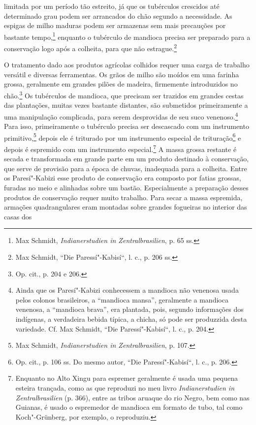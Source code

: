 limitada por um período tão estreito, já que os tubérculos crescidos até
determinado grau podem ser arrancados do chão segundo a necessidade. As
espigas de milho maduras podem ser armazenas sem mais precauções por
bastante tempo,\footnote{Max Schmidt, \emph{Indianerstudien in
  Zentralbrasilien}, p. 65 ss.} enquanto o tubérculo de mandioca
precisa ser preparado para a conservação logo após a colheita, para que
não estrague.\footnote{Max Schmidt, ``Die Paressí"-Kabisí``, l. c., p. 206
  ss.}

O tratamento dado aos produtos agrícolas colhidos requer uma carga de
trabalho versátil e diversas ferramentas. Os grãos de milho são moídos
em uma farinha grossa, geralmente em grandes pilões de madeira,
firmemente introduzidos no chão.\footnote{Op. cit., p. 204 e 206.} Os
tubérculos de mandioca, que precisam ser trazidos em grandes cestas das
plantações, muitas vezes bastante distantes, são submetidos
primeiramente a uma manipulação complicada, para serem desprovidas de
seu suco venenoso.\footnote{Ainda que os Paresí"-Kabizi conhecessem a
  mandioca não venenosa usada pelos colonos brasileiros, a ``mandioca
  mansa'', geralmente a mandioca venenosa, a ``mandioca brava'', era
  plantada, pois, segundo informações dos indígenas, a verdadeira bebida
  típica, a chicha, só pode ser produzzida desta variedade. Cf. Max
  Schmidt, ``Die Paressí"-Kabisí``, l. c., p. 204.} Para isso,
primeiramente o tubérculo precisa ser descascado com um instrumento
primitivo,\footnote{Max Schmidt, \emph{Indianerstudien in
  Zentralbrasilien}, p. 107.} depois ele é triturado por um instrumento
especial de trituração\footnote{Op. cit., p. 106 ss. Do mesmo autor,
  ``Die Paressí"-Kabisí``, l. c., p. 206.} e depois é espremido com um
instrumento especial.\footnote{Enquanto no Alto Xingu para espremer
  geralmente é usada uma pequena esteira trançada, como as que reproduzi
  no meu livro \emph{Indianerstudien in Zentralbrasilien} (p. 366),
  entre as tribos aruaque do rio Negro, bem como nas Guianas, é usado o
  espremedor de mandioca em formato de tubo, tal como Koch"-Grünberg, por
  exemplo, o reproduziu.} A massa grossa restante é secada e
transformada em grande parte em um produto destinado à conservação,
que serve de provisão para a época de chuvas, inadequada para a
colheita. Entre os Paresí"-Kabizi esse produto de conservação era
composto por fatias grossas, furadas no meio e alinhadas sobre um
bastão. Especialmente a preparação desses produtos de conservação requer
muito trabalho. Para secar a massa espremida, armações quadrangulares
eram montadas sobre grandes fogueiras no interior das casas dos
